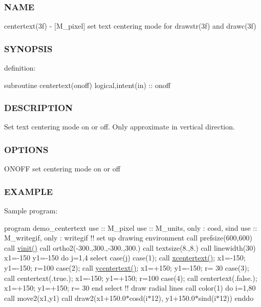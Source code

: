 \subsubsection*{N\+A\+ME}

centertext(3f) -\/ \mbox{[}M\+\_\+pixel\mbox{]} set text centering mode for drawstr(3f) and drawc(3f) 

\subsubsection*{S\+Y\+N\+O\+P\+S\+IS}

definition\+:

subroutine centertext(onoff) logical,intent(in) \+:\+: onoff

\subsubsection*{D\+E\+S\+C\+R\+I\+P\+T\+I\+ON}

Set text centering mode on or off. Only approximate in vertical direction.

\subsubsection*{O\+P\+T\+I\+O\+NS}

O\+N\+O\+FF set centering mode on or off

\subsubsection*{E\+X\+A\+M\+P\+LE}

Sample program\+:

program demo\+\_\+centertext use \+:\+: M\+\_\+pixel use \+:\+: M\+\_\+units, only \+: cosd, sind use \+:\+: M\+\_\+writegif, only \+: writegif !! set up drawing environment call prefsize(600,600) call \hyperlink{namespacem__pixel_ac03ca8f23fdadb60599b6ea4dc87a6d9}{vinit()} call ortho2(-\/300.,300.,-\/300.,300.) call textsize(8.,8.) call linewidth(30) x1=-\/150 y1=-\/150 do j=1,4 select case(j) case(1); call \hyperlink{namespacem__pixel_a1e0c43d36b35eafea921f91c31d8a478}{xcentertext()}; x1=-\/150; y1=-\/150; r=100 case(2); call \hyperlink{namespacem__pixel_a2e32105b5e77abf38768fec6b11376a3}{ycentertext()}; x1=+150; y1=-\/150; r= 30 case(3); call centertext(.true.); x1=-\/150; y1=+150; r=100 case(4); call centertext(.false.); x1=+150; y1=+150; r= 30 end select !! draw radial lines call color(1) do i=1,80 call move2(x1,y1) call draw2(x1+150.0$\ast$cosd(i$\ast$12), y1+150.0$\ast$sind(i$\ast$12)) enddo


